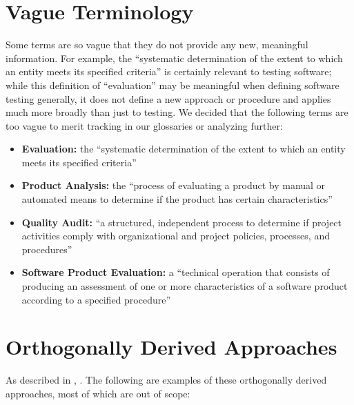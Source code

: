 \section{Vague Terminology}\label{vague-terms}

Some terms are so vague that they do not provide any new, meaningful
information. For example, the ``systematic determination of the extent to
which an entity meets its specified criteria'' \citep[p.~167]{IEEE2017} is
certainly relevant to testing software; while this definition of
``evaluation'' may be meaningful when defining software testing generally,
it does not define a new approach or procedure and applies much more
broadly than just to testing. We decided that the
following terms are too vague to merit tracking in our glossaries or
analyzing further:
\begin{itemize}
    \item \textbf{Evaluation:} the ``systematic determination of the extent
          to which an entity meets its specified criteria''
          \citep[p.~167]{IEEE2017}
    \item \textbf{Product Analysis:} the ``process of evaluating a product by
          manual or automated means to determine if the product has certain
          characteristics'' \citep[p.~343]{IEEE2017}
    \item \textbf{Quality Audit:} ``a structured, independent process to
          determine if project activities comply with organizational and
          project policies, processes, and procedures'' \citep[p.~361]{IEEE2017}
    \item \textbf{Software Product Evaluation:} a ``technical operation that
          consists of producing an assessment of one or more characteristics
          of a software product according to a specified procedure''
          \citep[p.~424]{IEEE2017}
\end{itemize}

\section{Orthogonally Derived Approaches}\label{app-orth-test}
As described in , \orthTestIntro*{}. The following are examples
of these orthogonally derived approaches, most of which are out of scope:

